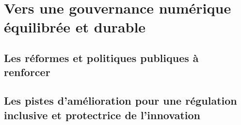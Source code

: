 
\chapter{Vers une gouvernance numérique équilibrée et durable}

\section{Les réformes et politiques publiques à renforcer}


\section{Les pistes d'amélioration pour une régulation inclusive et protectrice de l'innovation}

